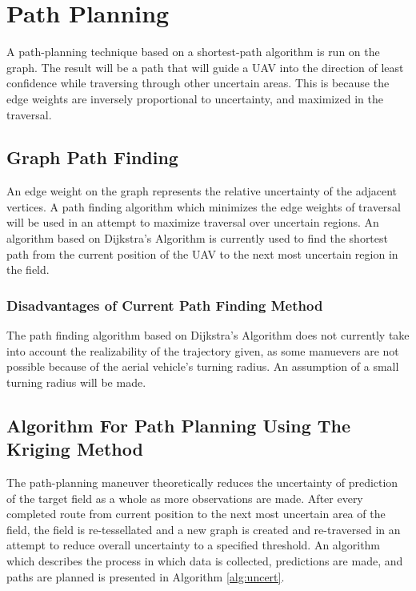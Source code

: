 \chapter{Path Planning}
A path-planning technique based on a shortest-path algorithm is run on the graph. The result will be a path that will guide a UAV into the direction of least confidence while traversing through other uncertain areas. This is because the edge weights are inversely proportional to uncertainty, and maximized in the traversal. 

\section{Graph Path Finding}
An edge weight on the graph represents the relative uncertainty of the adjacent vertices. A path finding algorithm which minimizes the edge weights of traversal will be used in an attempt to maximize traversal over uncertain regions. An algorithm based on Dijkstra's Algorithm is currently used to find the shortest path from the current position of the UAV to the next most uncertain region in the field. 

\subsection{Disadvantages of Current Path Finding Method}
The path finding algorithm based on Dijkstra's Algorithm does not currently take into account the realizability of the trajectory given, as some manuevers are not possible because of the aerial vehicle's turning radius. An assumption of a small turning radius will be made.

\section{Algorithm For Path Planning Using The Kriging Method}
The path-planning maneuver theoretically reduces the uncertainty of prediction of the target field as a whole as more observations are made. After every completed route from current position to the next most uncertain area of the field, the field is re-tessellated and a new graph is created and re-traversed in an attempt to reduce overall uncertainty to a specified threshold. An algorithm which describes the process in which data is collected, predictions are made, and paths are planned is presented in Algorithm \ref{alg:uncert}.

